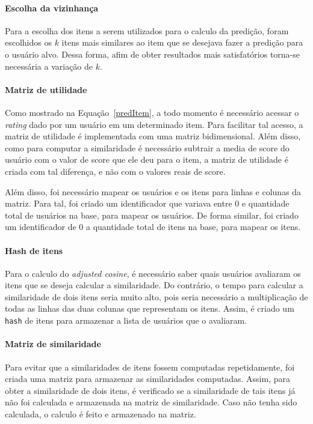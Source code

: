 \documentclass[brazil,a4paper,11pt]{article}
\begin{document}
\paragraph{Escolha da vizinhança} Para a escolha dos itens a serem utilizados para o calculo da predição, foram escolhidos os $k$ itens mais similares ao item que se desejava fazer a predição para o usuário alvo. Dessa forma, afim de obter resultados mais satisfatórios torna-se necessária a variação de $k$.

\paragraph{Matriz de utilidade} Como mostrado na Equação~\ref{predItem}, a todo momento é necessário acessar o \textit{rating} dado por um usuário em um determinado item. Para facilitar tal acesso, a matriz de utilidade é implementada com uma matriz bidimensional. Além disso, como para computar a similaridade é necessário subtrair a media de score do usuário com o valor de score que ele deu para o item, a matriz de utilidade é criada com tal diferença, e não com o valores reais de score. 

Além disso, foi necessário mapear os usuários e os itens para linhas e colunas da matriz. Para tal, foi criado um identificador que variava entre 0 e quantidade total de usuários na base, para mapear os usuários. De forma similar, foi criado um identificador de 0 a quantidade total de itens na base, para mapear os itens.

\paragraph{Hash de itens} Para o calculo do \textit{adjusted cosine}, é necessário saber quais usuários avaliaram os itens que se deseja calcular a similaridade. Do contrário, o tempo para calcular a similaridade de dois itens seria muito alto, pois seria necessário a multiplicação de todas as linhas das duas colunas que representam os itens. Assim, é criado um \texttt{hash} de itens para armazenar a lista de usuários que o avaliaram. 

\paragraph{Matriz de similaridade} Para evitar que a similaridades de itens fossem computadas repetidamente, foi criada uma matriz para armazenar as similaridades computadas. Assim, para obter a similaridade de dois itens, é verificado se a similaridade de tais itens já não foi calculada e armazenada na matriz de similaridade. Caso não tenha sido calculada, o calculo é feito e armazenado na matriz.
\end{document}
